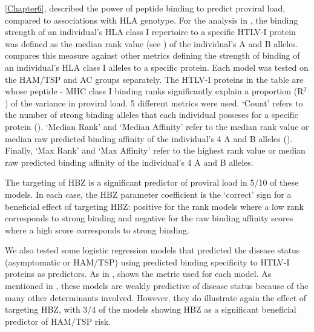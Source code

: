 \cref{Chapter6},  described the power of peptide binding to predict proviral load, compared to associations with HLA genotype. For the analysis in , the binding strength of an individual's HLA class I repertoire to a specific HTLV-I protein was defined as the median rank value (see ) of the individual's A and B alleles.  compares this measure against other metrics defining the strength of binding of an individual's HLA class I alleles to a specific protein. Each model was tested on the HAM/TSP and AC groups separately. The HTLV-I proteins in the table are whose peptide - MHC class I binding ranks significantly explain a proportion (R$^2$) of the variance in proviral load. 5 different metrics were used. `Count' refers to the number of strong binding alleles that each individual posseses for a specific protein (). `Median Rank' and `Median Affinity' refer to the median rank value or median raw predicted binding affinity of the individual's 4 A and B alleles (). Finally, `Max Rank' and `Max Affinity' refer to the highest rank value or median raw predicted binding affinity of the individual's 4 A and B alleles.

The targeting of HBZ is a significant predictor of proviral load in 5/10 of these models. In each case, the HBZ parameter coefficient is the `correct' sign for a beneficial effect of targeting HBZ: positive for the rank models where a low rank corresponds to strong binding and negative for the raw binding affinity scores where a high score corresponds to strong binding. 

We also tested some logistic regression models that predicted the disease status (asymptomatic or HAM/TSP) using predicted binding specificity to HTLV-I proteins as predictors. As in ,  shows the metric used for each model. As mentioned in , these models are weakly predictive of disease status because of the many other determinants involved. However, they do illustrate again the effect of targeting HBZ, with 3/4 of the models showing HBZ as a significant beneficial predictor of HAM/TSP risk.

